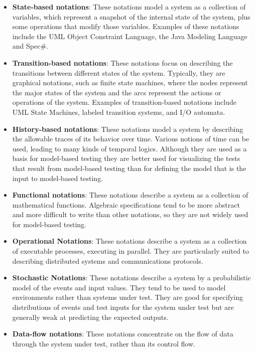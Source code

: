 \begin{itemize}
\item \textbf{State-based notations}: These notations model a system as a collection of
variables, which represent a snapshot of the internal state of the system, plus
some operations that modify those variables. Examples of these notations include
the UML Object Constraint Language, the Java Modeling Language and Spec\#.
\item \textbf{Transition-based notations}: These notations focus on describing the
transitions between different states of the system. Typically, they are
graphical notations, such as finite state machines, where the nodes represent
the major states of the system and the arcs represent the actions or operations
of the system. Examples of transition-based notations include UML State Machines,
labeled transition systems, and I/O automata.
\item \textbf{History-based notations}:  These notations model a system by
describing the allowable traces of its behavior over time. Various notions of
time can be used, leading to many kinds of temporal logics. Although they are
used as a basis for model-based testing they are better used for visualizing the
tests that result from model-based testing than for defining the model that is
the input to model-based testing.
\item \textbf{Functional notations}: These notations describe a system as a
collection of mathematical functions. Algebraic specifications tend to be more
abstract and more difficult to write than other notations, so they are not
widely used for model-based testing.
\item \textbf{Operational Notations}: These notations describe a system as a
collection of executable processes, executing in parallel. They are particularly
suited to describing distributed systems and communications protocols.
\item \textbf{Stochastic Notations}: These notations describe a system by a
probabilistic model of the events and input values. They tend to be used to model
environments rather than systems under test. They are good for specifying
distributions of events and test inputs for the system under test but are
generally weak at predicting the expected outputs.
\item \textbf{Data-flow notations}: These notations concentrate on the flow of
data through the system under test, rather than its control flow.
\end{itemize}

